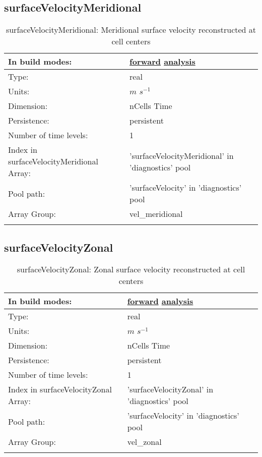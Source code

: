\subsection[surfaceVelocityMeridional]{surfaceVelocityMeridional}
\label{subsec:var_sec_diagnostics_surfaceVelocityMeridional}
\begin{center}
\begin{longtable}{| p{2.0in} | p{4.0in} |}
        \hline 
        In build modes: & \hyperref[subsec:forward_var_tab_diagnostics]{forward} \hyperref[subsec:analysis_var_tab_diagnostics]{analysis} \\
        \hline 
        Type: & real \\
        \hline 
        Units: & $m$ $s^{-1}$ \\
        \hline 
        Dimension: & nCells Time \\
        \hline 
        Persistence: & persistent \\
        \hline 
        Number of time levels: & 1 \\
        \hline 
		 Index in surfaceVelocityMeridional Array: & 'surfaceVelocityMeridional' in 'diagnostics' pool \\
		 \hline 
            Pool path: & 'surfaceVelocity' in 'diagnostics' pool
 \\
		 \hline 
		 Array Group: & vel\_meridional \\
		 \hline 
    \caption{surfaceVelocityMeridional: Meridional surface velocity reconstructed at cell centers}
\end{longtable}
\end{center}
\subsection[surfaceVelocityZonal]{surfaceVelocityZonal}
\label{subsec:var_sec_diagnostics_surfaceVelocityZonal}
\begin{center}
\begin{longtable}{| p{2.0in} | p{4.0in} |}
        \hline 
        In build modes: & \hyperref[subsec:forward_var_tab_diagnostics]{forward} \hyperref[subsec:analysis_var_tab_diagnostics]{analysis} \\
        \hline 
        Type: & real \\
        \hline 
        Units: & $m$ $s^{-1}$ \\
        \hline 
        Dimension: & nCells Time \\
        \hline 
        Persistence: & persistent \\
        \hline 
        Number of time levels: & 1 \\
        \hline 
		 Index in surfaceVelocityZonal Array: & 'surfaceVelocityZonal' in 'diagnostics' pool \\
		 \hline 
            Pool path: & 'surfaceVelocity' in 'diagnostics' pool
 \\
		 \hline 
		 Array Group: & vel\_zonal \\
		 \hline 
    \caption{surfaceVelocityZonal: Zonal surface velocity reconstructed at cell centers}
\end{longtable}
\end{center}
